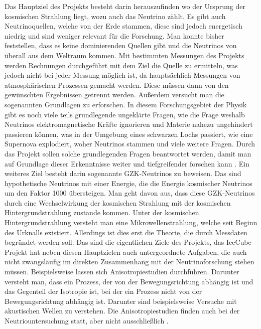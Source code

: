     
    Das Hauptziel des Projekts besteht darin herauszufinden wo der Ursprung der 
    kosmischen Strahlung liegt, wozu auch das Neutrino zählt. Es gibt auch Neutrinoquellen, 
    welche von der Erde stammen, diese sind jedoch energetisch niedrig und sind weniger 
    relevant für die Forschung. Man konnte bisher feststellen, dass es keine dominierenden 
    Quellen gibt und die Neutrinos von überall aus dem Weltraum kommen. Mit bestimmten 
    Messungen des Projekts werden Rechnungen durchgeführt mit dem Ziel die Quelle zu ermitteln, 
    was jedoch nicht bei jeder Messung möglich ist, 
    da hauptsächlich Messungen von atmosphärischen Prozessen gemacht werden. Diese müssen 
    dann von den gewünschten Ergebnissen getrennt werden. Außerdem versucht man die 
    sogenannten Grundlagen zu erforschen. In diesem Forschungsgebiet der Physik gibt es 
    noch viele teils grundlegende ungeklärte Fragen, wie die Frage weshalb Neutrinos 
    elektromagnetische Kräfte ignorieren und Materie nahezu ungehindert passieren können, 
    was in der Umgebung eines schwarzen Lochs passiert, wie eine Supernova explodiert, 
    woher Neutrinos stammen und viele weitere Fragen. Durch das Projekt sollen solche 
    grundlegenden Fragen beantwortet werden, damit man auf Grundlage dieser Erkenntnisse 
    weiter und tiefgreifender forschen kann \cite{FAQ13}. Ein weiteres Ziel besteht 
    darin sogenannte GZK-Neutrinos zu beweisen. Das sind hypothetische Neutrinos mit einer 
    Energie, die die Energie kosmischer Neutrinos um den Faktor 1000 übersteigen. Man geht 
    davon aus, dass diese GZK-Neutrinos durch eine Wechselwirkung der kosmischen Strahlung 
    mit der kosmischen Hintergrundstrahlung zustande kommen. Unter der kosmischen 
    Hintergrundstrahlung versteht man eine Mikrowellenstrahlung, welche seit Beginn des 
    Urknalls existiert. Allerdings ist dies erst die Theorie, die durch Messdaten begründet 
    werden soll. Das sind die eigentlichen Ziele des Projekts, das IceCube-Projekt hat neben 
    diesen Hauptzielen auch untergeordnete Aufgaben, die auch nicht zwangsläufig im direkten 
    Zusammenhang mit der Neutrinoforschung stehen müssen.  Beispielsweise lassen sich 
    Anisotropiestudien durchführen. Darunter versteht man, dass ein Prozess, der von der 
    Bewegungsrichtung abhängig ist und das Gegenteil der Isotropie ist, bei der ein Prozess 
    nicht von der Bewegungsrichtung abhängig ist. Darunter sind beispielsweise Versuche mit 
    akustischen Wellen zu verstehen. Die Anisotropiestudien finden auch bei der 
    Neutriountersuchung statt, aber nicht ausschließlich \cite{FAQ13}.

